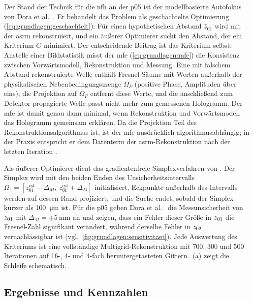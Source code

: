 Der Stand der Technik für die \ac{nfh} an der \ac{p05} ist der
modellbasierte Autofokus von Dora et al.\ \cite{dora2025autofocus}. Er behandelt das
Problem als geschachtelte Optimierung (\cref{eq:grundlagen:geschachtelt}):
Für einen hypothetischen Abstand $\hat z_{01}$ wird mit der \ac{asrm}
\cite{dora2024asrm} rekonstruiert, und ein äußerer Optimierer sucht den
Abstand, der ein Kriterium $G$ minimiert. Der entscheidende Beitrag ist das
Kriterium selbst: Anstelle einer Bildstatistik misst der \ac{mfe}
(\cref{eq:grundlagen:mfe}) die Konsistenz zwischen Vorwärtsmodell,
Rekonstruktion und Messung. Eine mit falschem Abstand rekonstruierte Welle
enthält Fresnel-Säume mit Werten außerhalb der physikalischen
Nebenbedingungsmenge $\Omega_P$ (positive Phase, Amplituden über eins); die
Projektion auf $\Omega_P$ entfernt diese Werte, und die anschließend zum
Detektor propagierte Welle passt nicht mehr zum gemessenen Hologramm. Der
\ac{mfe} ist damit genau dann minimal, wenn Rekonstruktion und
Vorwärtsmodell das Hologramm gemeinsam erklären. Da die Projektion Teil des
Rekonstruktionsalgorithmus ist, ist der \ac{mfe} ausdrücklich
algorithmusabhängig; in der Praxis entspricht er dem Datenterm der
\ac{asrm}-Rekonstruktion nach der letzten Iteration
\cite{dora2025autofocus}.

Als äußerer Optimierer dient das gradientenfreie Simplexverfahren von
\cite{neldermead1965simplex}. Der Simplex wird mit den beiden Enden des
Unsicherheitsintervalls $\Omega_z = [z^{\mathrm{est}}_{01} - \Delta_M,\
z^{\mathrm{est}}_{01} + \Delta_M]$ initialisiert, Eckpunkte außerhalb des
Intervalls werden auf dessen Rand projiziert, und die Suche endet, sobald
der Simplex kürzer als \qty{100}{\micro\metre} ist. Für die \ac{p05} geben
Dora et al.\ \cite{dora2025autofocus} die Messunsicherheit von $z_{01}$ mit
$\Delta_M = \pm\qty{5}{\milli\metre}$ an und zeigen, dass ein Fehler dieser
Größe in $z_{01}$ die Fresnel-Zahl signifikant verändert, während derselbe
Fehler in $z_{02}$ vernachlässigbar ist (vgl.\
\cref{fig:grundlagen:sensitivitaet}). Jede Auswertung des Kriteriums ist
eine vollständige Multigrid-Rekonstruktion mit 700, 300 und 500 Iterationen
auf 16-, 4- und 4-fach heruntergetasteten Gittern.
\Cref{fig:stand:autofokus-schema}\,(a) zeigt die Schleife schematisch.



\subsection{Ergebnisse und Kennzahlen}

